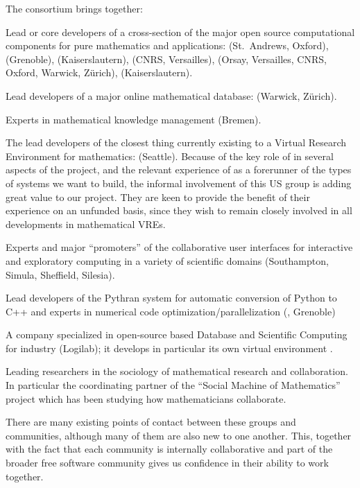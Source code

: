 The consortium brings together:
\begin{compactenum}
\item \label{mathsoftware} Lead or core developers of a cross-section of the major open
  source computational components for pure mathematics and applications: \GAP (St.~Andrews,
  Oxford), \Linbox (Grenoble), \MPIR (Kaiserslautern), \Pari (CNRS, Versailles), \Sage
  (Orsay, Versailles, CNRS, Oxford, Warwick, Zürich), \Singular (Kaiserslautern).
\item \label{mathdb} Lead developers of a major online mathematical database: \LMFDB
  (Warwick, Zürich).
\item \label{mathknowledge} Experts in mathematical knowledge management (Bremen).
\item \label{smc} The lead developers of the closest thing currently existing to a Virtual
  Research Environment for mathematics: \SMC (Seattle). Because of the key role of \Sage
  in several aspects of the project, and the relevant experience of \SMC as a forerunner of the types
  of systems we want to build, the informal involvement of this US group is adding great value to our project.
  They are keen to provide the benefit of their experience on an unfunded basis, since they wish to remain closely involved in
  all developments in mathematical VREs.
\item \label{jupyter} Experts and major ``promoters'' of the \Jupyter collaborative user
  interfaces for interactive and exploratory computing in a variety of scientific domains
  (Southampton, Simula, Sheffield, Silesia).
\item \label{pythran} Lead developers of the Pythran system for automatic conversion of
  Python to C++ and experts in numerical code optimization/parallelization (,
  Grenoble)
\item \label{logilab} A company specialized in open-source based Database and Scientific
  Computing for industry (Logilab); it develops in particular its own virtual environment
  \Simulagora.
\item \label{social} Leading researchers in the sociology of mathematical research and
  collaboration. In particular the coordinating partner of the ``Social Machine of
  Mathematics'' project which has been studying how mathematicians collaborate.
\end{compactenum}





There are many existing points of contact between these groups  and
communities, although many of them are also new to one another. This,
together with the fact that each community is internally collaborative
and part of the broader free software community gives us confidence in
their ability to work together.

